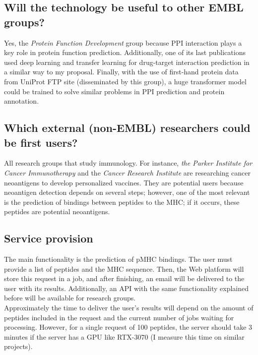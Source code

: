 \documentclass[a4paper,11pt]{article}
\begin{document}
\subsection{Will the technology be useful to other EMBL groups?}
Yes, the \textit{Protein Function Development} group because PPI interaction plays a key role in protein function prediction. Additionally, one of its last publications \cite{dalkiran2023transfer} used deep learning and transfer learning for drug-target interaction prediction in a similar way to my proposal. Finally, with the use of first-hand protein data from UniProt FTP site (disseminated by this group), a huge transformer model could be trained to solve similar problems in PPI prediction and protein annotation.\\


\subsection{Which external (non-EMBL) researchers could be first users?}
All research groups that study immunology. For instance, \textit{the Parker Institute for Cancer Immunotherapy} and the \textit{Cancer Research Institute} are researching cancer neoantigens to develop personalized vaccines. They are potential users because neoantigen detection depends on several steps; however, one of the most relevant is the prediction of bindings between peptides to the MHC; if it occurs, these peptides are potential neoantigens.

\subsection{Service provision}
The main functionality is the prediction of pMHC bindings. The user must provide a list of peptides and the MHC sequence. Then, the Web platform will store this request in a job, and after finishing, an email will be delivered to the user with its results. Additionally, an API with the same functionality explained before will be available for research groups. \\

Approximately the time to deliver the user's results will depend on the amount of peptides included in the request and the current number of jobs waiting for processing. However, for a single request of 100 peptides, the server should take 3 minutes if the server has a GPU like RTX-3070 (I measure this time on similar projects).\\
\end{document}
